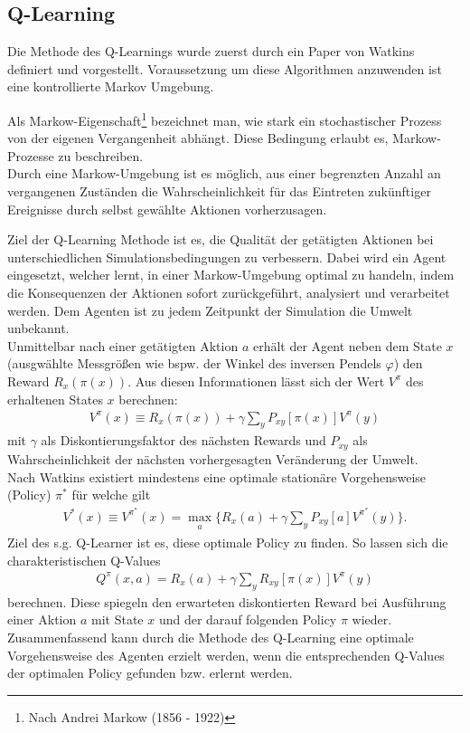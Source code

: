 	\subsection{Q-Learning}
	\label{subsec:rl_qlearning}
		Die Methode des Q-Learnings wurde zuerst durch ein Paper von Watkins \cite{Watkins1992} definiert und vorgestellt. Voraussetzung um diese Algorithmen anzuwenden ist eine kontrollierte Markov Umgebung.
		\begin{remark}
			Als Markow-Eigenschaft\footnote{Nach Andrei Markow (1856 - 1922)} bezeichnet man, wie stark ein stochastischer Prozess von der eigenen Vergangenheit abhängt. Diese Bedingung erlaubt es, Markow-Prozesse zu beschreiben.\\
			Durch eine Markow-Umgebung ist es möglich, aus einer begrenzten Anzahl an vergangenen Zuständen die Wahrscheinlichkeit für das Eintreten zukünftiger Ereignisse durch selbst gewählte Aktionen vorherzusagen. \cite{SilverRL}
		\end{remark}
		Ziel der Q-Learning Methode ist es, die Qualität der getätigten Aktionen bei unterschiedlichen Simulationsbedingungen zu verbessern. Dabei wird ein Agent eingesetzt, welcher lernt, in einer Markow-Umgebung optimal zu handeln, indem die Konsequenzen der Aktionen sofort zurückgeführt, analysiert und verarbeitet werden. Dem Agenten ist zu jedem Zeitpunkt der Simulation die Umwelt unbekannt.\\
		Unmittelbar nach einer getätigten Aktion $a$ erhält der Agent neben dem State $x$ (ausgwählte Messgrößen wie bspw. der Winkel des inversen Pendels $\varphi$) den Reward $R_x(\pi(x))$. Aus diesen Informationen lässt sich der Wert $V^\pi$ des erhaltenen States $x$ berechnen:
		\begin{align}
			V^\pi(x) \equiv R_x(\pi(x)) + \gamma \sum_{y}P_{xy}[\pi(x)]V^\pi(y)
		\end{align}
		mit $\gamma$ als Diskontierungsfaktor des nächsten Rewards und $P_{xy}$ als Wahrscheinlichkeit der nächsten vorhergesagten Veränderung der Umwelt.\\
		Nach Watkins existiert mindestens eine optimale stationäre Vorgehensweise (\glqq Policy\grqq) $\pi^*$ für welche gilt
		\begin{align}
			V^*(x) \equiv V^{\pi^*}(x) = \max_{\substack{a}} \bigg\{R_x(a) + \gamma \sum_{y}P_{xy}[a]V^{\pi^*}(y)\bigg\}.
		\end{align}
		Ziel des s.g. \glqq Q-Learner\grqq{} ist es, diese optimale Policy zu finden. So lassen sich die charakteristischen Q-Values
		\begin{align}
			Q^\pi(x,a) = R_x(a) + \gamma \sum_{y}R_{xy}[\pi(x)]V^\pi(y)
		\end{align}
		berechnen. Diese spiegeln den erwarteten diskontierten Reward bei Ausführung einer Aktion $a$ mit State $x$ und der darauf folgenden Policy $\pi$ wieder. Zusammenfassend kann durch die Methode des Q-Learning eine optimale Vorgehensweise des Agenten erzielt werden, wenn die entsprechenden Q-Values der optimalen Policy gefunden bzw. erlernt werden.
